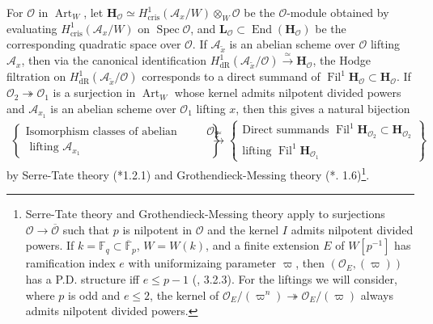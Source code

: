 \documentclass{amsart}
\numberwithin{equation}{subsection}
\numberwithin{theorem}{section}
\theoremstyle{definition}
\theoremstyle{remark}
\newcommand{\dR}{_{\mathrm{dR}}}
\newcommand{\cris}{_{\mathrm{cris}}}
\DeclareMathOperator{\End}{End}
\DeclareMathOperator{\Spec}{Spec}
\DeclareMathOperator{\Fil}{Fil}
\DeclareMathOperator{\Art}{Art}
\begin{document}
For $\mathscr{O}$ in $\Art_W$, let $\bm{H}_\mathscr{O}\simeq H^1\cris(\mathcal{A}_x/W)\otimes_W \mathscr{O}$ be the $\mathscr{O}$-module obtained by evaluating $H^1\cris(\mathcal{A}_x/W)$ on $\Spec \mathscr{O}$, and $\bm{L}_{\mathscr{O}} \subset \End(\bm{H}_\mathscr{O})$ be the corresponding quadratic space over $\mathscr{O}$. 
If $\mathcal{A}_{\tilde{x}}$ is an abelian scheme over $\mathscr{O}$ lifting $\mathcal{A}_x$, then via the canonical identification $H^1\dR(\mathcal{A}_{\tilde{x}}/\mathscr{O}) \xrightarrow{\simeq}\bm{H}_{\mathscr{O}}$, the Hodge filtration on $H^1\dR(\mathcal{A}_{\tilde{x}}/\mathscr{O})$ corresponds to a direct summand of $\Fil^1\bm{H}_{\mathscr{O}} \subset \bm{H}_{\mathscr{O}}$. If $\mathscr{O}_2 \twoheadrightarrow \mathscr{O}_1$ is a surjection in $\Art_{W}$ whose kernel admits nilpotent divided powers and $\mathcal{A}_{x_1}$ is an abelian scheme over $\mathscr{O}_1$ lifting $x$, then this gives a natural bijection 
\begin{align} \label{eq:SerreTateGrothendieckMessing}
\left\{
\begin{array}{c}
\text{Isomorphism classes of abelian schemes over }\mathscr{O}_2 \\
\text{ lifting }\mathcal{A}_{x_1}
\end{array}
\right\}
&\xrightarrow{\;\simeq\;}
\left\{
\begin{array}{c}
\text{Direct summands } \Fil^1\bm{H}_{\mathscr{O}_2} \subset \bm{H}_{\mathscr{O}_2} \\
\text{lifting } \Fil^1\bm{H}_{\mathscr{O}_1}
\end{array}
\right\}
\end{align}
by  Serre-Tate theory (\cite{MR638600}*{1.2.1}) and Grothendieck-Messing theory (\cite{MR347836}*{\MakeUppercase{}. 1.6})\footnote{Serre-Tate theory and Grothendieck-Messing theory apply to surjections $\mathscr{O}\to \overline{\mathscr{O}}$ such that $p$ is nilpotent in $\mathscr{O}$ and the kernel $I$ admits nilpotent divided powers. 
If $k = \mathbb{F}_q\subset \overline{\mathbb{F}}_p$, $W = W(k)$, and a finite extension $E$ of $W[p^{-1}]$ has ramification index $e$ with uniformizaing parameter $\varpi$, then $(\mathcal{O}_E, (\varpi))$ has a P.D. structure iff $e\leq p-1$ (\cite{MR491705}, 3.2.3). For the liftings we will consider, where $p$ is odd and $e\leq 2$, the kernel of  $\mathcal{O}_E/(\varpi^n)\twoheadrightarrow \mathcal{O}_E/(\varpi)$ always admits nilpotent divided powers. }.
\end{document}
